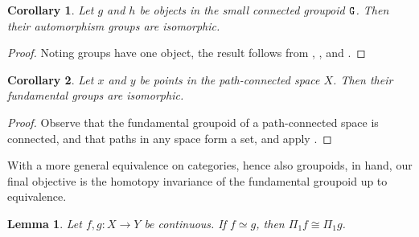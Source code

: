 \documentclass[11 pt]{amsart}
\theoremstyle{plain}   %
\newtheorem{cor}{Corollary}[section]
\newtheorem{lemma}{Lemma}[section]
\theoremstyle{definition}
\theoremstyle{remark}
\numberwithin{equation}{section}
\newcommand{\cat}[1]{{\normalfont\texttt{#1}}}
\begin{document}
\begin{cor}\label{connected groups are isomorphic}
	Let $g$ and $h$ be objects in the small connected groupoid $\cat{G}$. Then their
	automorphism groups are isomorphic.
\end{cor}

\begin{proof}
	Noting groups have one object, the result follows from , , and .
\end{proof}

\begin{cor}
	Let $x$ and $y$ be points in the path-connected space $X$. Then their
	fundamental groups are isomorphic.
\end{cor}

\begin{proof}
	Observe that the fundamental groupoid of a path-connected space is connected,
	and that paths in any space form a set, and apply .
\end{proof}

With a more general equivalence on categories, hence also groupoids, in hand,
our final objective is the homotopy invariance of the fundamental groupoid up to
equivalence.

\begin{lemma}
	Let $f,g: X\rightarrow Y$ be continuous. If $f\simeq g$, then
	$\Pi_1f\cong\Pi_1g$.
\end{lemma}
\end{document}

